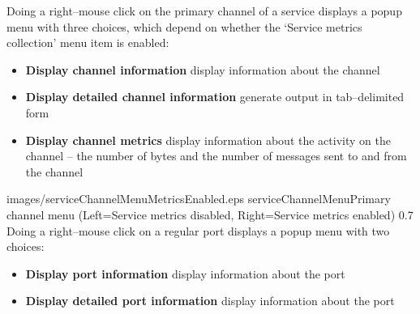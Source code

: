 Doing a right--mouse click on the primary channel of a service displays a popup menu with
three choices, which depend on whether the `Service metrics collection' menu item is
enabled:
\begin{itemize}
\item \textbf{Display channel information} display information about the channel
\item \textbf{Display detailed channel information} generate output in tab--delimited form
\item \textbf{Display channel metrics} display information about the activity on the
channel -- the number of bytes and the number of messages sent to and from the channel
\end{itemize}
%
{images/serviceChannelMenuMetricsEnabled.eps}%
{serviceChannelMenu}{Primary channel menu (Left=Service metrics disabled, Right=Service metrics enabled)}%
{0.7}
\clearpage
Doing a right--mouse click on a regular port displays a popup menu with two choices:
\begin{itemize}
\item \textbf{Display port information} display information about the port
\item \textbf{Display detailed port information} display information about the port
\end{itemize}

